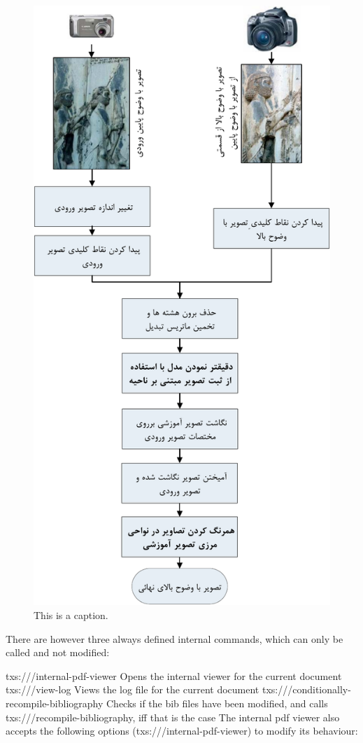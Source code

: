 \documentclass{article}
\begin{document}
	\begin{figure}
		\includegraphics[width=0.9\linewidth]{Images/Flowchar}
		\caption{This is a caption.}
		\label{fig:sample}
	\end{figure}

	There are however three always defined internal commands, which can only be called and not modified:
	
	txs:///internal-pdf-viewer	Opens the internal viewer for the current document
	txs:///view-log	Views the log file for the current document
	txs:///conditionally-recompile-bibliography	Checks if the bib files have been modified, and calls txs:///recompile-bibliography, iff that is the case
	The internal pdf viewer also accepts the following options (txs:///internal-pdf-viewer) to modify its behaviour:
	
\end{document}
